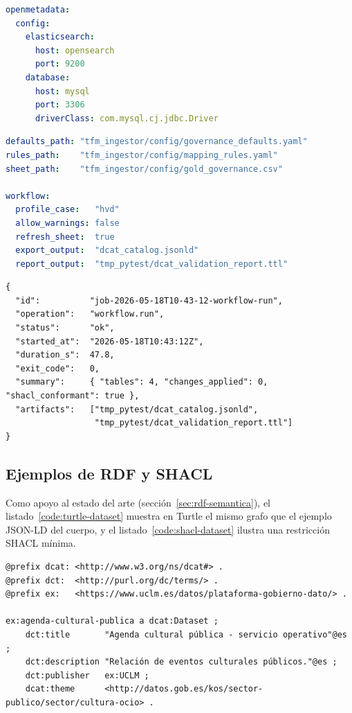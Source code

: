 \begin{lstlisting}[language=yaml, caption={Fragmento de \texttt{k8s/openmetadata.values.yaml}: configuración mínima del release Helm.}, label=code:k8s-values, captionpos=b]
openmetadata:
  config:
    elasticsearch:
      host: opensearch
      port: 9200
    database:
      host: mysql
      port: 3306
      driverClass: com.mysql.cj.jdbc.Driver
\end{lstlisting}

\begin{lstlisting}[language=yaml, caption={Perfil operativo \texttt{operational\_profile.yaml} que enlaza defaults, reglas, hoja y caso de validación.}, label=code:operational-profile-yaml, captionpos=b]
defaults_path: "tfm_ingestor/config/governance_defaults.yaml"
rules_path:    "tfm_ingestor/config/mapping_rules.yaml"
sheet_path:    "tfm_ingestor/config/gold_governance.csv"

workflow:
  profile_case:   "hvd"
  allow_warnings: false
  refresh_sheet:  true
  export_output:  "dcat_catalog.jsonld"
  report_output:  "tmp_pytest/dcat_validation_report.ttl"
\end{lstlisting}

\begin{lstlisting}[language=jsonld, caption={Estructura de un \emph{job} persistido en \texttt{state/web\_jobs/}.}, label=code:web-job-state, captionpos=b]
{
  "id":          "job-2026-05-18T10-43-12-workflow-run",
  "operation":   "workflow.run",
  "status":      "ok",
  "started_at":  "2026-05-18T10:43:12Z",
  "duration_s":  47.8,
  "exit_code":   0,
  "summary":     { "tables": 4, "changes_applied": 0, "shacl_conformant": true },
  "artifacts":   ["tmp_pytest/dcat_catalog.jsonld",
                  "tmp_pytest/dcat_validation_report.ttl"]
}
\end{lstlisting}

\subsection{Ejemplos de RDF y SHACL}

Como apoyo al estado del arte (sección~\ref{sec:rdf-semantica}), el listado~\ref{code:turtle-dataset} muestra en Turtle el mismo grafo que el ejemplo JSON-LD del cuerpo, y el listado~\ref{code:shacl-dataset} ilustra una restricción SHACL mínima.

\begin{lstlisting}[language=Turtle, caption={Tripletas RDF que describen un dataset DCAT en sintaxis Turtle (mismo grafo que el listado~\ref{code:jsonld-dataset}).}, label=code:turtle-dataset, captionpos=b]
@prefix dcat: <http://www.w3.org/ns/dcat#> .
@prefix dct:  <http://purl.org/dc/terms/> .
@prefix ex:   <https://www.uclm.es/datos/plataforma-gobierno-dato/> .

ex:agenda-cultural-publica a dcat:Dataset ;
    dct:title       "Agenda cultural pública - servicio operativo"@es ;
    dct:description "Relación de eventos culturales públicos."@es ;
    dct:publisher   ex:UCLM ;
    dcat:theme      <http://datos.gob.es/kos/sector-publico/sector/cultura-ocio> .
\end{lstlisting}

